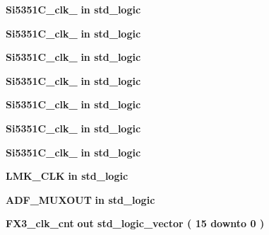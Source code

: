 \begin{DoxyCompactItemize}
\item 
{\bf Si5351\+C\+\_\+clk\+\_}  {\bfseries {\bfseries \textcolor{keywordflow}{in}\textcolor{vhdlchar}{ }}} {\bfseries \textcolor{comment}{std\+\_\+logic}\textcolor{vhdlchar}{ }} 
\item 
{\bf Si5351\+C\+\_\+clk\+\_}  {\bfseries {\bfseries \textcolor{keywordflow}{in}\textcolor{vhdlchar}{ }}} {\bfseries \textcolor{comment}{std\+\_\+logic}\textcolor{vhdlchar}{ }} 
\item 
{\bf Si5351\+C\+\_\+clk\+\_}  {\bfseries {\bfseries \textcolor{keywordflow}{in}\textcolor{vhdlchar}{ }}} {\bfseries \textcolor{comment}{std\+\_\+logic}\textcolor{vhdlchar}{ }} 
\item 
{\bf Si5351\+C\+\_\+clk\+\_}  {\bfseries {\bfseries \textcolor{keywordflow}{in}\textcolor{vhdlchar}{ }}} {\bfseries \textcolor{comment}{std\+\_\+logic}\textcolor{vhdlchar}{ }} 
\item 
{\bf Si5351\+C\+\_\+clk\+\_}  {\bfseries {\bfseries \textcolor{keywordflow}{in}\textcolor{vhdlchar}{ }}} {\bfseries \textcolor{comment}{std\+\_\+logic}\textcolor{vhdlchar}{ }} 
\item 
{\bf Si5351\+C\+\_\+clk\+\_}  {\bfseries {\bfseries \textcolor{keywordflow}{in}\textcolor{vhdlchar}{ }}} {\bfseries \textcolor{comment}{std\+\_\+logic}\textcolor{vhdlchar}{ }} 
\item 
{\bf Si5351\+C\+\_\+clk\+\_}  {\bfseries {\bfseries \textcolor{keywordflow}{in}\textcolor{vhdlchar}{ }}} {\bfseries \textcolor{comment}{std\+\_\+logic}\textcolor{vhdlchar}{ }} 
\item 
{\bf L\+M\+K\+\_\+\+C\+LK}  {\bfseries {\bfseries \textcolor{keywordflow}{in}\textcolor{vhdlchar}{ }}} {\bfseries \textcolor{comment}{std\+\_\+logic}\textcolor{vhdlchar}{ }} 
\item 
{\bf A\+D\+F\+\_\+\+M\+U\+X\+O\+UT}  {\bfseries {\bfseries \textcolor{keywordflow}{in}\textcolor{vhdlchar}{ }}} {\bfseries \textcolor{comment}{std\+\_\+logic}\textcolor{vhdlchar}{ }} 
\item 
{\bf F\+X3\+\_\+clk\+\_\+cnt}  {\bfseries {\bfseries \textcolor{keywordflow}{out}\textcolor{vhdlchar}{ }}} {\bfseries \textcolor{comment}{std\+\_\+logic\+\_\+vector}\textcolor{vhdlchar}{ }\textcolor{vhdlchar}{(}\textcolor{vhdlchar}{ }\textcolor{vhdlchar}{ } \textcolor{vhdldigit}{15} \textcolor{vhdlchar}{ }\textcolor{keywordflow}{downto}\textcolor{vhdlchar}{ }\textcolor{vhdlchar}{ } \textcolor{vhdldigit}{0} \textcolor{vhdlchar}{ }\textcolor{vhdlchar}{)}\textcolor{vhdlchar}{ }} 
\item 

\end{DoxyCompactItemize}
